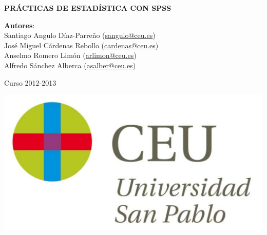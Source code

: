 \documentclass[a4paper,dvips,openright]{report}
\begin{document}
\begin{titlepage}
\vspace*{5cm}
\begin{center}
{\huge \bf PRÁCTICAS DE ESTADÍSTICA CON SPSS\par}
\vspace{0.5cm}
{\large \noindent \textbf{Autores}: \\
Santiago Angulo Díaz-Parreño (\url{sangulo@ceu.es})\\
José Miguel Cárdenas Rebollo (\url{cardenas@ceu.es})\\
Anselmo Romero Limón (\url{arlimon@ceu.es})\\
Alfredo Sánchez Alberca (\url{asalber@ceu.es})
}

\vspace{0.5cm}
{\large Curso 2012-2013}

\vspace{1cm}
 \includegraphics[scale=0.3]{img/logo_uspceu_01}
\end{center}
\end{titlepage}


\renewcommand{\thepage}{\roman{page}}
\setcounter{page}{1} 
\thispagestyle{plain}
\tableofcontents
\cleardoublepage
\renewcommand{\thepage}{\arabic{page}}
\setcounter{page}{1} 




%
%
%
%
%
%
%
% 
%
%
%
\end{document}
